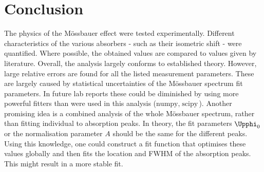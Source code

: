 
\section{Conclusion}
\label{sec:conclusion}

The physics of the Mössbauer effect were tested experimentally. Different
characteristics of the various absorbers - such as their isometric shift - were 
quantified. Where possible, the obtained values are compared to values given by
literature. Overall, the analysis largely conforms to established theory. However,
large relative errors are found for all the listed measurement parameters. These are 
largely caused by statistical uncertainties of the Mössbauer spectrum fit parameters.
In future lab reports these could be diminished by using more powerful fitters than 
were used in this analysis ($\text{numpy},\;\text{scipy}$). Another promising idea is
a combined analysis of the whole Mössbauer spectrum, rather than fitting individual 
to absorption peaks. In theory, the fit parameters $\Upphi_0$ or the normalisation 
parameter $A$ should be the same for the different peaks. Using this knowledge, one
could construct a fit function that optimises these values globally and then fits 
the location and FWHM of the absorption peaks. This might result in a more stable
fit.

